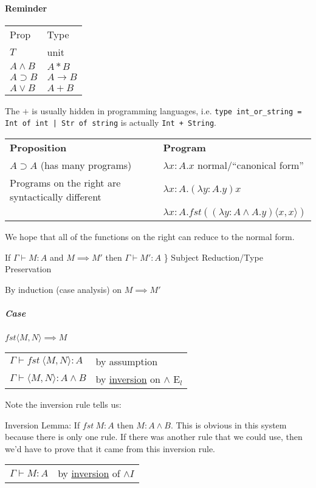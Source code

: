 \documentclass[12 pt]{article}
\begin{document}
      \paragraph{Reminder}
      \begin{tabular}{l l}
        Prop & Type
        \\ $T$ & unit
        \\ $A \land B$ & $A * B$
        \\ $A \supset B$ & $A \rightarrow B$
        \\ $ A \lor B$ & $A + B$
      \end{tabular}
      The $+$ is usually hidden in programming languages,
      i.e. \texttt{type int\_or\_string = Int of int | Str of string}
      is actually \texttt{Int + String}.
    \begin{center}
      \begin{tabular}{l l}
        \textbf{Proposition} & \textbf{Program}
        \\ $A \supset A$ (has many programs) & $\lambda x:A.x$ \hspace{10 pt}normal/``canonical form''
        \\ Programs on the right are syntactically different & $\lambda x : A . (\lambda y: A . y) x$
        \\ & $\lambda x : A . fst ((\lambda y:A \land A . y) \langle x,x \rangle)$
      \end{tabular}
    \end{center}
    We hope that all of the functions on the right can reduce to the
    normal form.

    If $\Gamma \vdash M : A$ and $M \implies M'$ then $\Gamma \vdash
    M' : A$ \} Subject Reduction/Type Preservation

    By induction (case analysis) on $M \implies M'$
    \subparagraph{Case} $fst \langle M,N \rangle \implies M$
    \\\begin{tabular}{l l}
    $\Gamma \vdash fst\ \langle M,N \rangle : A$ & by assumption
    \\ $\Gamma \vdash \langle M,N \rangle : A \land B$ & by \underline{inversion} on
    $\land$ E$_l$
    \end{tabular}

    Note the inversion rule tells us:
    \begin{prooftree}
    \end{prooftree}
    Inversion Lemma: If $fst\ M : A$ then $M:A \land B$. This is
    obvious in this system because there is only one rule. If there
    was another rule that we could use, then we'd have to prove that
    it came from this inversion rule.
    \\\begin{tabular}{l l}
    $\Gamma \vdash M : A$ & by \underline{inversion} of $\land I$
    \end{tabular}
\end{document}
